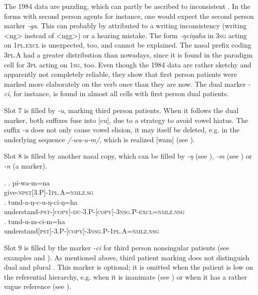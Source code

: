 The 1984 data are puzzling, which can partly be ascribed to inconsistent . In the forms with second person agents for instance, one would expect the second person marker \emph{-ga}. This can probably by attributed to a writing inconsistency (writing <ng> instead of <ngg>) or a hearing mistake. The form \emph{-ŋciŋaha} in {\scshape 3sg} acting on {\scshape 1pl.excl} is unexpected, too, and cannot be explained. The nasal prefix coding {\scshape 3pl.A} had a greater distribution than nowadays, since it is found in the paradigm cell for {\scshape 3pl} acting on {\scshape 1sg}, too. Even though the 1984 data are rather sketchy and apparently not completely reliable, they show that first person patients were marked more elaborately on the verb once than they are now. The dual  marker \emph{-ci}, for instance, is found in almost all cells with first person dual patients. 

Slot 7 is filled by  \emph{-u}, marking third person patients. When it follows the dual marker, both suffixes fuse into [cu], due to a strategy to avoid vowel hiatus. The suffix \emph{-u} does not only cause vowel elision, it may itself be deleted, e.g. in the underlying sequence \emph{/-wa-u-m/}, which is realized [wam] (see \Next[a]). 

Slot 8 is filled by another nasal copy, which can be filled by \emph{-ŋ} (see \Next[b]), \emph{-m} (see \Next[c]) or \emph{-n} (a  marker).

\ex. \ag. pi-wa-m=na\\
	give{\scshape -npst[3.P]-1pl.A=nmlz.sg}\\
	\bg.	tund-a-ŋ-c-u-ŋ-ci-ŋ=ha\\
	understand{\scshape -pst-[copy]-du-3.P-[copy]-3nsg.P-excl=nmlz.nsg}\\
	\bg.	tund-u-m-ci-m=ha\\
	understand{\scshape [pst]-3.P-[copy]-3nsg.P-1pl.A=nmlz.nsg}\\

	
Slot 9  is filled by the marker \emph{-ci} for third person nonsingular patients (see examples \Last[b] and \Last[c]). As mentioned above, third  patient marking does not distinguish dual and plural . This marker is optional; it is omitted when the patient is low on the referential hierarchy, e.g. when it is inanimate (see \Next[a]) or when it has a rather vague reference (see \Next[b]). 



